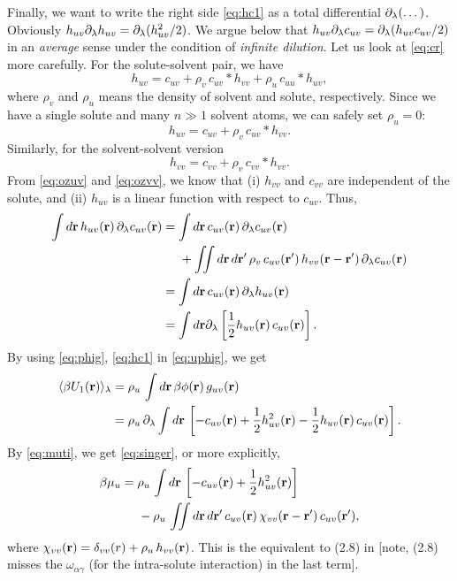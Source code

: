 \documentclass[12pt]{article}
\begin{document}
Finally, we want to write the right side \eqref{eq:hc1} as
a total differential $\partial_\lambda(\dots)$.
%
Obviously $h_{uv} \partial_\lambda h_{uv} = \partial_\lambda ( h_{uv}^2/2 )$.
%
We argue below that $h_{uv} \partial_\lambda c_{uv} = \partial_\lambda ( h_{uv} c_{uv} /2) $
in an \emph{average} sense under the condition of \emph{infinite dilution}.
Let us look at \eqref{eq:cr} more carefully.
%
For the solute-solvent pair, we have
\[
  h_{uv} = c_{uv} + \rho_v \, c_{uv}*h_{vv}
  + \rho_u \, c_{uu}*h_{uv},
\]
where $\rho_v$ and $\rho_u$ means the density of
solvent and solute, respectively.
%
Since we have a single solute and many $n \gg 1$ solvent atoms,
we can safely set $\rho_u = 0$:
\begin{equation}
  h_{uv} = c_{uv} + \rho_v \, c_{uv}*h_{vv}.
  \label{eq:ozuv}
\end{equation}
%
Similarly, for the solvent-solvent version
\begin{equation}
  h_{vv} = c_{vv} + \rho_v \, c_{vv}*h_{vv}.
  \label{eq:ozvv}
\end{equation}
From \eqref{eq:ozuv} and \eqref{eq:ozvv}, we know that
  (i) $h_{vv}$ and $c_{vv}$ are independent of the solute,
  and
  (ii) $h_{uv}$ is a linear function with respect to $c_{uv}$.
%
Thus,
\begin{align}
  \int d\mathbf{r} \, h_{uv}(\mathbf{r}) \, \partial_\lambda c_{uv}(\mathbf{r})
  &=
  \int d\mathbf{r} \,
  c_{uv}(\mathbf{r}) \, \partial_\lambda c_{uv}(\mathbf{r}) \notag \\
  & \;\;\;\;\;
    +
    \iint d\mathbf{r} \, d\mathbf{r}'
    \, \rho_v
    \, c_{uv}(\mathbf{r}')
    \, h_{vv}(\mathbf{r} - \mathbf{r}')
    \, \partial_\lambda c_{uv}(\mathbf{r}) \notag \\
  &= \int d\mathbf{r} \, c_{uv}(\mathbf{r}) \, \partial_\lambda h_{uv}(\mathbf{r}) \notag \\
  &= \int d\mathbf{r} \partial_\lambda
    \left[
      \frac{1}{2} h_{uv}(\mathbf{r}) \,  c_{uv}(\mathbf{r})
    \right].
  \label{eq:phig}
\end{align}
%
By using \eqref{eq:phig}, \eqref{eq:hc1} in \eqref{eq:uphig}, we get
%
\begin{align*}
  \langle
  \beta U_1(\mathbf{r})
  \rangle_\lambda
  &=
  \rho_u \,
  \int d \mathbf{r}
  \, \beta \phi(\mathbf{r}) \, g_{uv}(\mathbf{r}) \\
  &=
   \rho_u \, \partial_\lambda \int d \mathbf{r} \,
   \left[
    - c_{uv}(\mathbf{r})
    + \frac{1}{2} h_{uv}^2(\mathbf{r})
    - \frac{1}{2} h_{uv}(\mathbf{r}) \, c_{uv}(\mathbf{r})
    \right].
  \end{align*}
%
%
%
By \eqref{eq:muti}, we get \eqref{eq:singer}, or more explicitly,
\begin{align}
  \beta \mu_u
  &=
   \rho_u \, \int
    d \mathbf{r} \,
   \left[
    - c_{uv}(\mathbf{r})
    + \frac{1}{2} h_{uv}^2(\mathbf{r})
    \right]
  \notag \\
  & \;\;\;\;\;
    -
    \rho_u \, \iint d\mathbf{r} \, d\mathbf{r}'
    \, c_{uv}(\mathbf{r})
    \, \chi_{vv}(\mathbf{r} - \mathbf{r}')
    \, c_{uv}(\mathbf{r}'),
 \label{eq:muexpanded}
\end{align}
where
$\chi_{vv}(\mathbf{r}) = \delta_{vv}(r) + \rho_u \, h_{vv}(\mathbf{r})$.
%
This is the equivalent to (2.8) in \cite{singer}
[note,
(2.8) misses the $\omega_{\alpha\gamma}$ (for the intra-solute interaction)
in the last term].
\end{document}
